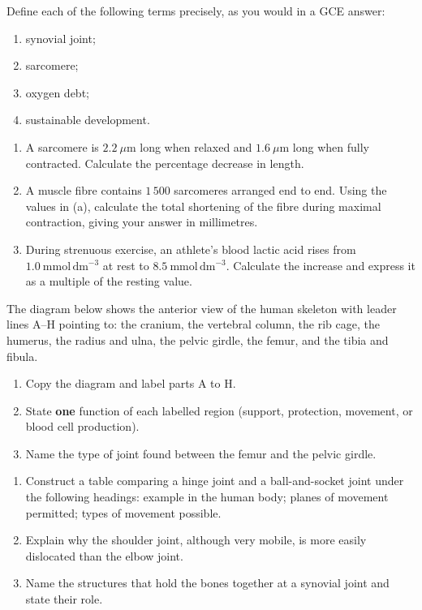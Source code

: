 \documentclass[11pt]{article}
\newcounter{popsec}
\newcounter{popsub}
\newcommand{\courssub}[1]{%
  \stepcounter{popsub}%
  \par\vspace{9pt}\noindent{\popxbold\fontsize{11.5}{13}\selectfont\color{popink}{\color{poporange}\thepopsec.\thepopsub}\hspace{6pt}#1}\par\nopagebreak\vspace{4pt}
}
\begin{document}
\begin{exercice}
Define each of the following terms precisely, as you would in a GCE answer:
\begin{enumerate}
\item synovial joint;
\item sarcomere;
\item oxygen debt;
\item sustainable development.
\end{enumerate}
\end{exercice}

\begin{exercice}
\begin{enumerate}
\item A sarcomere is $2.2\ \mu\mathrm{m}$ long when relaxed and $1.6\ \mu\mathrm{m}$ long when fully contracted. Calculate the percentage decrease in length.
\item A muscle fibre contains $1\,500$ sarcomeres arranged end to end. Using the values in (a), calculate the total shortening of the fibre during maximal contraction, giving your answer in millimetres.
\item During strenuous exercise, an athlete's blood lactic acid rises from $1.0\ \mathrm{mmol\,dm^{-3}}$ at rest to $8.5\ \mathrm{mmol\,dm^{-3}}$. Calculate the increase and express it as a multiple of the resting value.
\end{enumerate}
\end{exercice}

\courssub{I practise}

\begin{exercice}
The diagram below shows the anterior view of the human skeleton with leader lines A--H pointing to: the cranium, the vertebral column, the rib cage, the humerus, the radius and ulna, the pelvic girdle, the femur, and the tibia and fibula.
\begin{enumerate}
\item Copy the diagram and label parts A to H.
\item State \textbf{one} function of each labelled region (support, protection, movement, or blood cell production).
\item Name the type of joint found between the femur and the pelvic girdle.
\end{enumerate}
\end{exercice}

\begin{exercice}
\begin{enumerate}
\item Construct a table comparing a hinge joint and a ball-and-socket joint under the following headings: example in the human body; planes of movement permitted; types of movement possible.
\item Explain why the shoulder joint, although very mobile, is more easily dislocated than the elbow joint.
\item Name the structures that hold the bones together at a synovial joint and state their role.
\end{enumerate}
\end{exercice}
\end{document}
